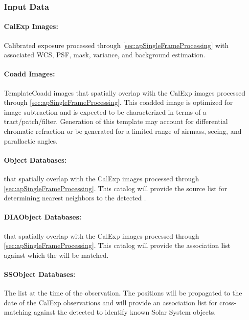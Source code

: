 \subsubsection{Input Data}
\label{sec:apAGInput}

\paragraph*{CalExp Images:} Calibrated exposure processed through \ref{sec:apSingleFrameProcessing} with associated WCS, PSF, mask, variance, and background estimation.

\paragraph*{Coadd Images:} TemplateCoadd images that spatially overlap with the CalExp images processed through \ref{sec:apSingleFrameProcessing}. This coadded image is optimized for image subtraction and is expected to be characterized in terms of a tract/patch/filter. Generation of this template may account for differential chromatic refraction or be generated for a limited range of airmass, seeing, and parallactic angles.

\paragraph*{Object Databases:} \Objects that spatially overlap with the CalExp images processed through \ref{sec:apSingleFrameProcessing}. This \Object catalog will provide the source list for determining nearest neighbors to the detected \DIASources.


\paragraph*{DIAObject Databases:} \DIAObjects that spatially overlap with the CalExp images processed through \ref{sec:apSingleFrameProcessing}. This \DIAObject catalog will provide the association  list against which the \DIASources will be matched.

\paragraph*{SSObject Databases:} The \SSObject list at the time of the observation. The \SSObject positions will be propagated to the date of the CalExp observations and will provide an association  list for cross-matching against the detected \DIASources to identify known Solar System objects.


